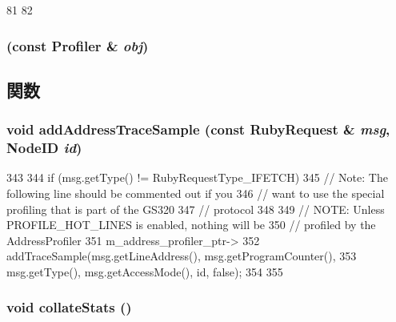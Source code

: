 \begin{DoxyCode}
81 {
82 }
\end{DoxyCode}
\hypertarget{classProfiler_a790e796e0ecb72b0d281875555505219}{
\subsubsection[{Profiler}]{ (const {\bf Profiler} \& {\em obj})}}
\label{classProfiler_a790e796e0ecb72b0d281875555505219}


\subsection{関数}
\hypertarget{classProfiler_a0a3e52657e723b58457b1dca1c10e01c}{
\subsubsection[{addAddressTraceSample}]{\setlength{\rightskip}{0pt plus 5cm}void addAddressTraceSample (const {\bf RubyRequest} \& {\em msg}, \/  {\bf NodeID} {\em id})}}
\label{classProfiler_a0a3e52657e723b58457b1dca1c10e01c}



\begin{DoxyCode}
343 {
344     if (msg.getType() != RubyRequestType_IFETCH) {
345         // Note: The following line should be commented out if you
346         // want to use the special profiling that is part of the GS320
347         // protocol
348 
349         // NOTE: Unless PROFILE_HOT_LINES is enabled, nothing will be
350         // profiled by the AddressProfiler
351         m_address_profiler_ptr->
352             addTraceSample(msg.getLineAddress(), msg.getProgramCounter(),
353                            msg.getType(), msg.getAccessMode(), id, false);
354     }
355 }
\end{DoxyCode}
\hypertarget{classProfiler_a208669cbc0bb1d52565956ca8c690c55}{
\subsubsection[{collateStats}]{\setlength{\rightskip}{0pt plus 5cm}void collateStats ()}}
\label{classProfiler_a208669cbc0bb1d52565956ca8c690c55}



